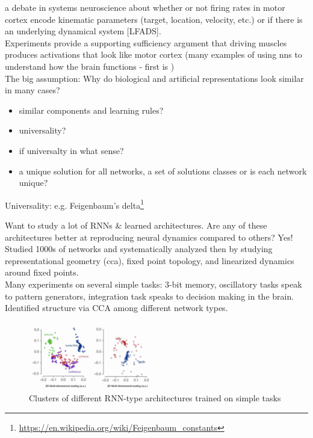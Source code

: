 \documentclass[12pt]{article}
\begin{document}
\cite{Churchland2012, Sussillo2015} a debate in systems neuroscience about whether or not firing rates in motor cortex encode kinematic parameters (target, location, velocity, etc.) or if there is an underlying dynamical system [LFADS].  \\

Experiments provide a supporting sufficiency argument that driving muscles produces activations that look like motor cortex (many examples of using nns to understand how the brain functions - first is \cite{Zipser1988}) \\

The big assumption: Why do biological and artificial representations look similar in many cases?
\begin{itemize}
    \item similar components and learning rules?
    \item universality?
    \item if universalty in what sense?
    \item a unique solution for all networks, a set of solutions classes or is each network unique?
\end{itemize}

Universality: e.g. Feigenbaum's delta\footnote{\url{https://en.wikipedia.org/wiki/Feigenbaum_constants}}

Want to study a lot of RNNs \& learned architectures. Are any of these architectures better at reproducing neural dynamics compared to others? Yes! Studied 1000s of networks and systematically analyzed then by studying representational geometry (cca), fixed point topology, and linearized dynamics around fixed points. \\

Many experiments on several simple tasks: 3-bit memory, oscillatory tasks speak to pattern generators, integration task speaks to decision making in the brain. \\

Identified structure via CCA among different network types.
\begin{figure}
  \centering
      \includegraphics[width=0.5\textwidth]{images/nnclust.png}
  \caption{Clusters of different RNN-type architectures trained on simple tasks}
\end{figure}
\end{document}
